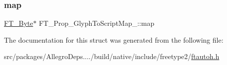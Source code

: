 \subsubsection{\texorpdfstring{map}{map}}
{\footnotesize\ttfamily \hyperlink{fttypes_8h_a51f26183ca0c9f4af958939648caeccd}{F\+T\+\_\+\+Byte}$\ast$ F\+T\+\_\+\+Prop\+\_\+\+Glyph\+To\+Script\+Map\+\_\+\+::map}



The documentation for this struct was generated from the following file\+:\begin{DoxyCompactItemize}
\item 
src/packages/\+Allegro\+Deps..../build/native/include/freetype2/\hyperlink{ftautoh_8h}{ftautoh.\+h}\end{DoxyCompactItemize}

